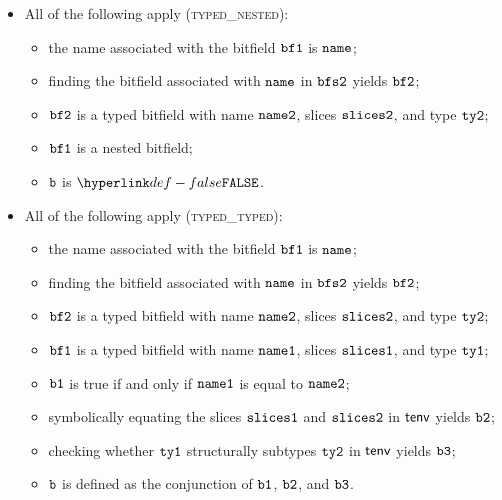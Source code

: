 \begin{itemize}
  \item All of the following apply (\textsc{typed\_nested}):
  \begin{itemize}
    \item the name associated with the bitfield $\texttt{bf1}$ is $\texttt{name}$;
    \item finding the bitfield associated with $\texttt{name}$ in $\texttt{bfs2}$ yields $\texttt{bf2}$;
    \item $\texttt{bf2}$ is a typed bitfield with name $\texttt{name2}$, slices $\texttt{slices2}$, and type $\texttt{ty2}$;
    \item $\texttt{bf1}$ is a nested bitfield;
    \item $\texttt{b}$ is $\False$.
  \end{itemize}

  \item All of the following apply (\textsc{typed\_typed}):
  \begin{itemize}
    \item the name associated with the bitfield $\texttt{bf1}$ is $\texttt{name}$;
    \item finding the bitfield associated with $\texttt{name}$ in $\texttt{bfs2}$ yields $\texttt{bf2}$;
    \item $\texttt{bf2}$ is a typed bitfield with name $\texttt{name2}$, slices $\texttt{slices2}$, and type $\texttt{ty2}$;
    \item $\texttt{bf1}$ is a typed bitfield with name $\texttt{name1}$, slices $\texttt{slices1}$, and type $\texttt{ty1}$;
    \item $\texttt{b1}$ is true if and only if $\texttt{name1}$ is equal to $\texttt{name2}$;
    \item symbolically equating the slices $\texttt{slices1}$ and $\texttt{slices2}$ in $\textsf{tenv}$ yields $\texttt{b2}$;
    \item checking whether $\texttt{ty1}$ structurally subtypes $\texttt{ty2}$ in $\textsf{tenv}$ yields $\texttt{b3}$;
    \item $\texttt{b}$ is defined as the conjunction of $\texttt{b1}$, $\texttt{b2}$, and $\texttt{b3}$.
  \end{itemize}
\end{itemize}



